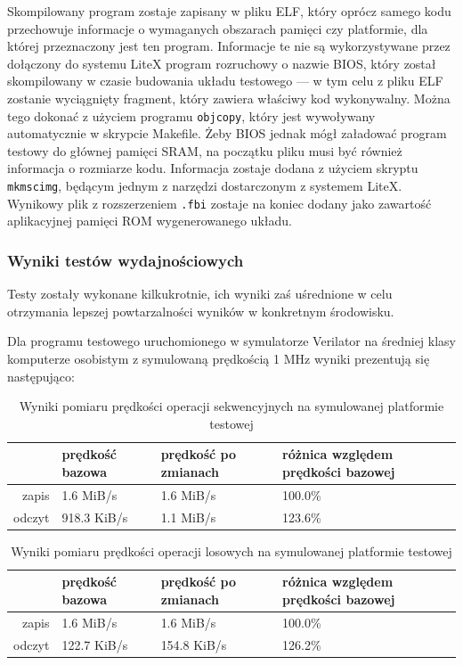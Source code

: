 Skompilowany program zostaje zapisany w pliku ELF, który oprócz samego kodu przechowuje informacje o wymaganych obszarach pamięci czy platformie, dla której przeznaczony jest ten program. Informacje te nie są wykorzystywane przez dołączony do systemu LiteX program rozruchowy o nazwie BIOS, który został skompilowany w czasie budowania układu testowego --- w tym celu z pliku ELF zostanie wyciągnięty fragment, który zawiera właściwy kod wykonywalny. Można tego dokonać z użyciem programu \texttt{objcopy}, który jest wywoływany automatycznie w skrypcie Makefile. Żeby BIOS jednak mógł załadować program testowy do głównej pamięci SRAM, na początku pliku musi być również informacja o rozmiarze kodu. Informacja zostaje dodana z użyciem skryptu \texttt{mkmscimg}, będącym jednym z narzędzi dostarczonym z systemem LiteX. Wynikowy plik z rozszerzeniem \texttt{.fbi} zostaje na koniec dodany jako zawartość aplikacyjnej pamięci ROM wygenerowanego układu.

\subsubsection{Wyniki testów wydajnościowych}

Testy zostały wykonane kilkukrotnie, ich wyniki zaś uśrednione w celu otrzymania lepszej powtarzalności wyników w konkretnym środowisku.

Dla programu testowego uruchomionego w symulatorze Verilator na średniej klasy komputerze osobistym z symulowaną prędkością 1 MHz wyniki prezentują się następująco:

\begin{center}

\begin{table}[H]
\begin{tabular}{ r|l|l|l| }
  & prędkość bazowa & prędkość po zmianach & różnica względem prędkości bazowej\\
 \hline
 zapis & 1.6 MiB/s & 1.6 MiB/s & 100.0\%\\
 odczyt & 918.3 KiB/s & 1.1 MiB/s & 123.6\%\\
 \hline
\end{tabular}
\caption{\label{tab:benchmark-seq-sim}Wyniki pomiaru prędkości operacji sekwencyjnych na symulowanej platformie testowej}
\end{table}

\begin{table}[H]
\begin{tabular}{ r|l|l|l| }
  & prędkość bazowa & prędkość po zmianach & różnica względem prędkości bazowej\\
 \hline
 zapis & 1.6 MiB/s & 1.6 MiB/s & 100.0\%\\
 odczyt & 122.7 KiB/s & 154.8 KiB/s & 126.2\%\\
 \hline
\end{tabular}
\caption{\label{tab:benchmark-rnd-sim}Wyniki pomiaru prędkości operacji losowych na symulowanej platformie testowej}
\end{table}

\end{center}

